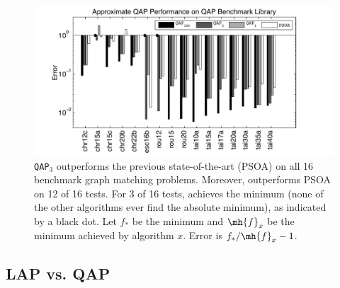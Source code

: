 \documentclass[10pt,journal,cspaper,compsoc]{IEEEtran}
\begin{document}
\begin{figure}[htbp]
	\centering			
	\includegraphics[width=1.0\linewidth]{../figs/benchmarks.pdf}
	\caption{\texttt{QAP}$_3$ outperforms the previous state-of-the-art (PSOA) on all 16 benchmark graph matching problems.  Moreover, \qapa outperforms PSOA on 12 of 16 tests.  For 3 of 16 tests, \qapb achieves the minimum (none of the other algorithms ever find the absolute minimum), as indicated by a black dot.  Let $f_*$ be the minimum and $\mh{f}_x$ be the minimum achieved by algorithm $x$.  Error is $f_*/\mh{f}_x-1$.  }
	\label{fig:fwpath}
\end{figure}





\subsection{LAP vs. QAP} %
\label{sub:lap_vs_qap}
\end{document}
